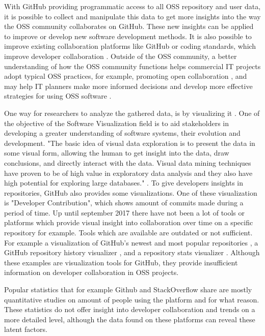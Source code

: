 \documentclass[acmtog, authorversion]{acmart}
\begin{document}
With GitHub providing programmatic access to all OSS repository and user data\cite{GHAPI}, it is possible to collect and manipulate this data to get more insights into the way the OSS community collaborates on GitHub.
These new insights can be applied to improve or develop new software development methods. It is also possible to improve existing collaboration platforms like GitHub or coding standards, which improve developer collaboration \cite{Jermakovics2013}.
Outside of the OSS community, a better understanding of how the OSS community functions helps commercial IT projects adopt typical OSS practices, for example, promoting open collaboration \cite{Kalliamvakou:2015:OSC:2818754.2818825}, and may help IT planners make more informed decisions and develop more effective strategies for using OSS software \cite{madey2002}.

One way for researchers to analyze the gathered data, is by visualizing it \cite{Heller}.
One of the objective of the Software Visualization field is to aid stakeholders in developing a greater understanding of software systems, their evolution and development.
"The basic idea of visual data exploration is to present the data in some visual form, allowing the human to get insight into the data, draw conclusions, and directly interact with the data.
Visual data mining techniques have proven to be of high value in exploratory data analysis and they also have high potential for exploring large databases." \cite{981847}.
To give developers insights in repositories, GitHub also provides some visualizations. 
One of these visualization is "Developer Contribution", which shows amount of commits made during a period of time.
Up until september 2017 there have not been a lot of tools or platforms which provide visual insight into collaboration over time on a specific repository for example.
Tools which are available are outdated \cite{Heller} or not sufficient. For example a visualization of GitHub's newest and most popular repositories \cite{donnemartin2016}, a GitHub repository history visualizer \cite{artzub2013}, and a repository stats visualizer \cite{bajaj2013}.
Although these examples are visualization tools for GitHub, they provide insufficient information on developer collaboration in OSS projects.

Popular statistics that for example Github \cite{GHOctoverse} and StackOverflow \cite{StackOverflow2017} share are mostly quantitative studies on amount of people using the platform and for what reason.
These statistics do not offer insight into developer collaboration and trends on a more detailed level, although the data found on these platforms can reveal these latent factors.
\end{document}
